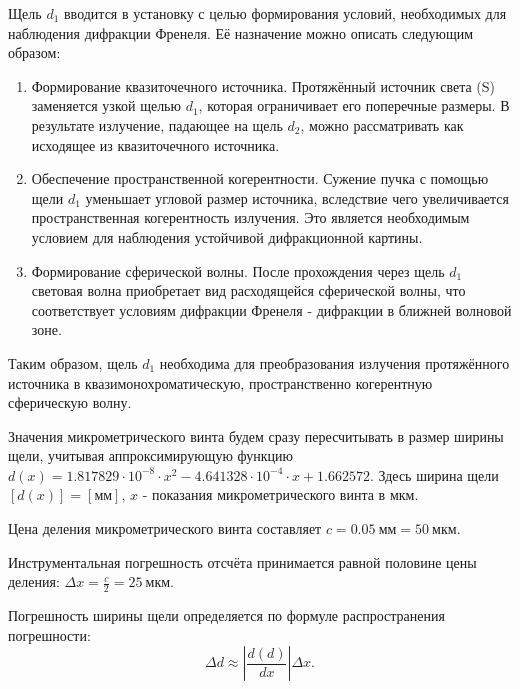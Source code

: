 \documentclass[a4paper,11pt]{extarticle} %
\begin{document}
\par 

Щель $d_1$ вводится в установку с целью формирования условий, необходимых для наблюдения дифракции Френеля. Её назначение можно описать следующим образом: 
\begin{enumerate}[label=\arabic*)]
    \item  Формирование квазиточечного источника.
   Протяжённый источник света (S) заменяется узкой щелью $d_1$, которая ограничивает его поперечные размеры. В результате излучение, падающее на щель $d_2$, можно рассматривать как исходящее из квазиточечного источника.

\item Обеспечение пространственной когерентности.
   Сужение пучка с помощью щели $d_1$ уменьшает угловой размер источника, вследствие чего увеличивается пространственная когерентность излучения. Это является необходимым условием для наблюдения устойчивой дифракционной картины.

\item Формирование сферической волны.
   После прохождения через щель $d_1$ световая волна приобретает вид расходящейся сферической волны, что соответствует условиям дифракции Френеля - дифракции в ближней волновой зоне.

\end{enumerate}

Таким образом, щель $d_1$ необходима для преобразования излучения протяжённого источника в квазимонохроматическую, пространственно когерентную сферическую волну.



Значения микрометрического винта будем сразу пересчитывать в размер ширины щели, учитывая аппроксимирующую функцию $d(x) = 1.817829 \cdot 10^{-8}
\cdot x^2 - 4.641328 \cdot 10^{-4} \cdot x + 1.662572$.
Здесь ширина щели $[d(x)] = [\text{мм}]$, $x$ - показания микрометрического винта в мкм.



Цена деления микрометрического винта составляет $c = 0.05\ \text{мм} = 50\ \text{мкм}.$


Инструментальная погрешность отсчёта принимается равной половине цены деления: $
\Delta x = \frac{c}{2} = 25\ \text{мкм}.$

Погрешность ширины щели определяется по формуле распространения погрешности:
\begin{equation}
\Delta d \approx \left| \frac{d(d)}{dx} \right|\Delta x.
\end{equation}
\end{document}
